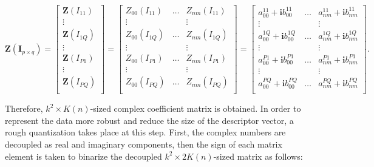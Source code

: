 \documentclass[]{spie}  %
\begin{document}
\begin{equation}
\mathbf{Z} ( \mathbf{I}_{p\times q} )= 
\begin{bmatrix}
\mathbf{Z}(I_{11}) \\
  \vdots \\
\mathbf{Z}(I_{1Q}) \\
  \vdots \\
\mathbf{Z}(I_{P1}) \\
  \vdots \\
\mathbf{Z}(I_{PQ}) \\
 \end{bmatrix} = 
 \begin{bmatrix}
Z_{00}(I_{11}) & \hdots & Z_{nm}(I_{11}) \\
  \vdots  & & \vdots \\
Z_{00}(I_{1Q}) & \hdots & Z_{nm}(I_{1Q}) \\
  \vdots  & & \vdots \\
Z_{00}(I_{P1}) & \hdots & Z_{nm}(I_{P1}) \\
  \vdots  & & \vdots \\
Z_{00}(I_{PQ}) & \hdots & Z_{nm}(I_{PQ}) \\
 \end{bmatrix} = 
 \begin{bmatrix}
a_{00}^{11} + \mathbf{i}b_{00}^{11} & \hdots & a_{nm}^{11} + \mathbf{i}b_{nm}^{11} \\
  \vdots  & & \vdots \\
a_{00}^{1Q} + \mathbf{i}b_{00}^{1Q} & \hdots & a_{nm}^{1Q} + \mathbf{i}b_{nm}^{1Q} \\
  \vdots  & & \vdots \\
a_{00}^{P1} + \mathbf{i}b_{00}^{P1} & \hdots & a_{nm}^{P1} + \mathbf{i}b_{nm}^{P1} \\
  \vdots  & & \vdots \\
a_{00}^{PQ} + \mathbf{i}b_{00}^{PQ} & \hdots & a_{nm}^{PQ} + \mathbf{i}b_{nm}^{PQ} \\
 \end{bmatrix}.
 \label{eq:lzm_op}
\end{equation}

Therefore, $k^2\times K(n)$-sized complex coefficient matrix is obtained. In order to represent the data more robust and reduce the size of the descriptor vector, a rough quantization takes place at this step. First, the complex numbers are decoupled as real and imaginary components, then the sign of each matrix element is taken to binarize the decoupled $k^2\times 2K(n)$-sized matrix as follows:
\end{document}
